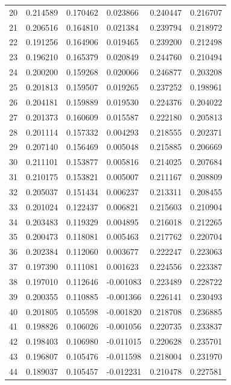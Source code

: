 \documentclass[a4paper, 12pt]{article}
\begin{document}
\begin{tabularx}{\linewidth}{|X|X|X|X|X|X|}
    20 & 0.214589 & 0.170462 & 0.023866 & 0.240447 & 0.216707 \\
    21 & 0.206516 & 0.164810 & 0.021384 & 0.239794 & 0.218972 \\
    22 & 0.191256 & 0.164906 & 0.019465 & 0.239200 & 0.212498 \\
    23 & 0.196210 & 0.165379 & 0.020849 & 0.244760 & 0.210494 \\
    24 & 0.200200 & 0.159268 & 0.020066 & 0.246877 & 0.203208 \\
    25 & 0.201813 & 0.159507 & 0.019265 & 0.237252 & 0.198961 \\
    26 & 0.204181 & 0.159889 & 0.019530 & 0.224376 & 0.204022 \\
    27 & 0.201373 & 0.160609 & 0.015587 & 0.222180 & 0.205813 \\
    28 & 0.201114 & 0.157332 & 0.004293 & 0.218555 & 0.202371 \\
    29 & 0.207140 & 0.156469 & 0.005048 & 0.215885 & 0.206669 \\
    30 & 0.211101 & 0.153877 & 0.005816 & 0.214025 & 0.207684 \\
    31 & 0.210175 & 0.153821 & 0.005007 & 0.211167 & 0.208809 \\
    32 & 0.205037 & 0.151434 & 0.006237 & 0.213311 & 0.208455 \\
    33 & 0.201024 & 0.122437 & 0.006821 & 0.215603 & 0.210904 \\
    34 & 0.203483 & 0.119329 & 0.004895 & 0.216018 & 0.212265 \\
    35 & 0.200473 & 0.118081 & 0.005463 & 0.217762 & 0.220704 \\
    36 & 0.202384 & 0.112060 & 0.003677 & 0.222247 & 0.223063 \\
    37 & 0.197390 & 0.111081 & 0.001623 & 0.224556 & 0.223387 \\
    38 & 0.197010 & 0.112646 & -0.001083 & 0.223489 & 0.228722 \\
    39 & 0.200355 & 0.110885 & -0.001366 & 0.226141 & 0.230493 \\
    40 & 0.201805 & 0.105598 & -0.001820 & 0.218708 & 0.236885 \\
    41 & 0.198826 & 0.106026 & -0.001056 & 0.220735 & 0.233837 \\
    42 & 0.198403 & 0.106980 & -0.011015 & 0.220628 & 0.235701 \\
    43 & 0.196807 & 0.105476 & -0.011598 & 0.218004 & 0.231970 \\
    44 & 0.189037 & 0.105457 & -0.012231 & 0.210478 & 0.227581 \\

\end{tabularx}
\end{document}
